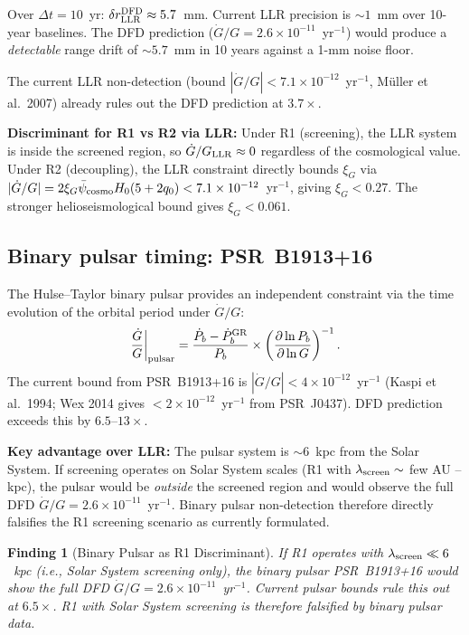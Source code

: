 \documentclass[aps,prd,twocolumn,superscriptaddress,nofootinbib,longbibliography]{revtex4-2}
\newcommand{\psibar}{\bar{\psi}}
\newcommand{\ee}[1]{\times 10^{#1}}
\newtheorem{finding}{Finding}
\begin{document}
Over $\Delta t = 10$~yr: $\delta r_{\rm LLR}^{\rm DFD} \approx 5.7$~mm.
Current LLR precision is $\sim\!1$~mm over 10-year baselines.  The DFD
prediction ($\dot{G}/G = 2.6\ee{-11}$~yr$^{-1}$) would produce a
\emph{detectable} range drift of $\sim\!5.7$~mm in 10 years against a
1-mm noise floor.

The current LLR non-detection (bound $|\dot{G}/G| < 7.1\ee{-12}$~yr$^{-1}$,
M\"{u}ller et al.\ 2007) already rules out the DFD prediction at $3.7\times$.

\textbf{Discriminant for R1 vs R2 via LLR:} Under R1 (screening), the LLR
system is inside the screened region, so $\dot{G}/G_{\rm LLR} \approx 0$
regardless of the cosmological value.  Under R2 (decoupling), the LLR
constraint directly bounds $\xi_G$ via $|\dot{G}/G| = 2\xi_G\psibar_{\rm cosmo}
H_0(5+2q_0) < 7.1\ee{-12}$~yr$^{-1}$, giving $\xi_G < 0.27$.  The
stronger helioseismological bound gives $\xi_G < 0.061$.

\subsection{Binary pulsar timing: PSR~B1913+16}

The Hulse--Taylor binary pulsar provides an independent constraint via
the time evolution of the orbital period under $\dot{G}/G$:
\begin{equation}
\left.\frac{\dot{G}}{G}\right|_{\rm pulsar}
= \frac{\dot{P}_b - \dot{P}_b^{\rm GR}}{P_b}
\times\left(\frac{\partial \ln P_b}{\partial \ln G}\right)^{-1}.
\label{eq:pulsar-Gdot}
\end{equation}
The current bound from PSR~B1913+16 is $|\dot{G}/G| < 4\ee{-12}$~yr$^{-1}$
(Kaspi et al.\ 1994; Wex 2014 gives $< 2\ee{-12}$~yr$^{-1}$ from PSR~J0437).
DFD prediction exceeds this by $6.5$--$13\times$.

\textbf{Key advantage over LLR:} The pulsar system is $\sim\!6$~kpc from
the Solar System.  If screening operates on Solar System scales (R1 with
$\lambda_{\rm screen} \sim$ few AU -- kpc), the pulsar would be \emph{outside}
the screened region and would observe the full DFD $\dot{G}/G = 2.6\ee{-11}$~yr$^{-1}$.
Binary pulsar non-detection therefore directly falsifies the R1 screening
scenario as currently formulated.

\begin{finding}[Binary Pulsar as R1 Discriminant]
If R1 operates with $\lambda_{\rm screen} \ll 6$~kpc (i.e., Solar System
screening only), the binary pulsar PSR~B1913+16 would show the full DFD
$\dot{G}/G = 2.6\ee{-11}$~yr$^{-1}$.  Current pulsar bounds rule this out
at $6.5\times$.  R1 with Solar System screening is therefore falsified
by binary pulsar data.
\end{finding}
\end{document}
